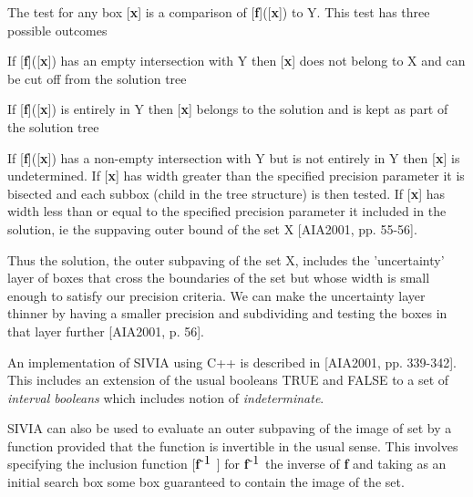 \-The test for any box \mbox{[}{\bfseries x}\mbox{]} is a comparison of \mbox{[}{\bfseries f}\mbox{]}(\mbox{[}{\bfseries x}\mbox{]}) to \-Y. \-This test has three possible outcomes


\begin{DoxyEnumerate}
\item \-If \mbox{[}{\bfseries f}\mbox{]}(\mbox{[}{\bfseries x}\mbox{]}) has an empty intersection with \-Y then \mbox{[}{\bfseries x}\mbox{]} does not belong to \-X and can be cut off from the solution tree 
\item \-If \mbox{[}{\bfseries f}\mbox{]}(\mbox{[}{\bfseries x}\mbox{]}) is entirely in \-Y then \mbox{[}{\bfseries x}\mbox{]} belongs to the solution and is kept as part of the solution tree 
\item \-If \mbox{[}{\bfseries f}\mbox{]}(\mbox{[}{\bfseries x}\mbox{]}) has a non-\/empty intersection with \-Y but is not entirely in \-Y then \mbox{[}{\bfseries x}\mbox{]} is undetermined. \-If \mbox{[}{\bfseries x}\mbox{]} has width greater than the specified precision parameter it is bisected and each subbox (child in the tree structure) is then tested. \-If \mbox{[}{\bfseries x}\mbox{]} has width less than or equal to the specified precision parameter it included in the solution, ie the suppaving outer bound of the set \-X \mbox{[}\-A\-I\-A2001, pp. 55-\/56\mbox{]}. 
\end{DoxyEnumerate}

\-Thus the solution, the outer subpaving of the set \-X, includes the 'uncertainty' layer of boxes that cross the boundaries of the set but whose width is small enough to satisfy our precision criteria. \-We can make the uncertainty layer thinner by having a smaller precision and subdividing and testing the boxes in that layer further \mbox{[}\-A\-I\-A2001, p. 56\mbox{]}.

\-An implementation of \-S\-I\-V\-I\-A using \-C++ is described in \mbox{[}\-A\-I\-A2001, pp. 339-\/342\mbox{]}. \-This includes an extension of the usual booleans \-T\-R\-U\-E and \-F\-A\-L\-S\-E to a set of {\itshape interval booleans\/} which includes notion of {\itshape indeterminate\/}.

\-S\-I\-V\-I\-A can also be used to evaluate an outer subpaving of the image of set by a function provided that the function is invertible in the usual sense. \-This involves specifying the inclusion function \mbox{[}{\bfseries f}$^{\mbox{-\/1}}$ \mbox{]} for {\bfseries f}$^{\mbox{-\/1}}$  the inverse of {\bfseries f} and taking as an initial search box some box guaranteed to contain the image of the set.



